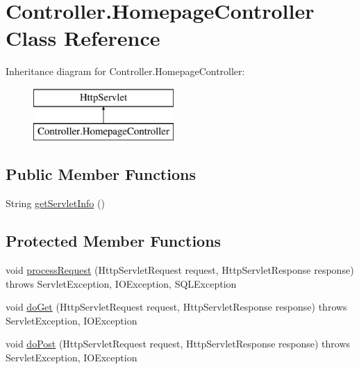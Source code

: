 \hypertarget{class_controller_1_1_homepage_controller}{}\section{Controller.\+Homepage\+Controller Class Reference}
\label{class_controller_1_1_homepage_controller}
Inheritance diagram for Controller.\+Homepage\+Controller\+:\begin{figure}[H]
\begin{center}
\leavevmode
\includegraphics[height=2.000000cm]{class_controller_1_1_homepage_controller}
\end{center}
\end{figure}
\subsection*{Public Member Functions}
\begin{DoxyCompactItemize}
\item 
String \mbox{\hyperlink{class_controller_1_1_homepage_controller_a93b1c23bee1cc391c7d6629a290c87c1}{get\+Servlet\+Info}} ()
\end{DoxyCompactItemize}
\subsection*{Protected Member Functions}
\begin{DoxyCompactItemize}
\item 
void \mbox{\hyperlink{class_controller_1_1_homepage_controller_a687e3c77e846d1267d06490228cd00c1}{process\+Request}} (Http\+Servlet\+Request request, Http\+Servlet\+Response response)  throws Servlet\+Exception, I\+O\+Exception, S\+Q\+L\+Exception 
\item 
void \mbox{\hyperlink{class_controller_1_1_homepage_controller_acd5d3f848681669a6ac9da03d44d1db8}{do\+Get}} (Http\+Servlet\+Request request, Http\+Servlet\+Response response)  throws Servlet\+Exception, I\+O\+Exception 
\item 
void \mbox{\hyperlink{class_controller_1_1_homepage_controller_a63947f9fbb47fa8b78fc058089fe3f37}{do\+Post}} (Http\+Servlet\+Request request, Http\+Servlet\+Response response)  throws Servlet\+Exception, I\+O\+Exception 
\end{DoxyCompactItemize}
